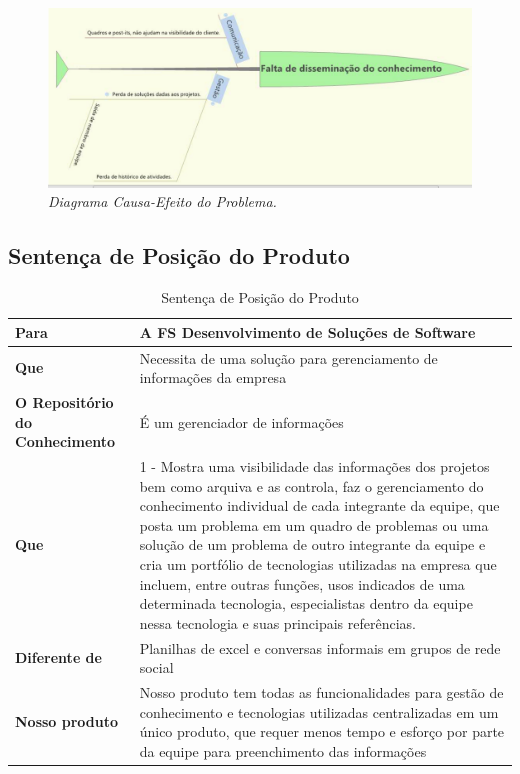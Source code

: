 \begin{figure}[H]
\centering\includegraphics[scale=0.5]{figuras/fishbone.png}
\caption{\textit{Diagrama Causa-Efeito do Problema.}}
\end{figure}


\subsection{Sentença de Posição do Produto}
\begin{table}[H]
\caption{Sentença de Posição do Produto}
\centering
\begin{tabular}{ | p{3cm} | p{9cm}| }
\hline
\textbf{Para} & A FS Desenvolvimento de Soluções de Software\\ \hline
\textbf{Que} & Necessita de uma solução para gerenciamento de informações da empresa \\ \hline
\textbf{O Repositório do Conhecimento} & É um  gerenciador de informações \\ \hline
\textbf{Que} & 1 - Mostra uma visibilidade das informações dos projetos bem como arquiva e as controla, faz o gerenciamento do conhecimento individual de cada integrante da equipe, que posta um problema em um quadro de problemas ou uma solução de um problema de outro integrante da equipe e cria um portfólio de tecnologias utilizadas na empresa que incluem, entre outras funções, usos indicados de uma determinada tecnologia, especialistas dentro da equipe nessa tecnologia e suas principais referências.
 \\ \hline
 \textbf{Diferente de} & Planilhas de excel e conversas informais em grupos de rede social\\ \hline
 \textbf{Nosso produto} & Nosso produto tem todas as funcionalidades para gestão de conhecimento e tecnologias utilizadas centralizadas em um único produto, que requer menos tempo e esforço por parte da equipe para preenchimento das informações\\ \hline
\end{tabular}
\end{table}

